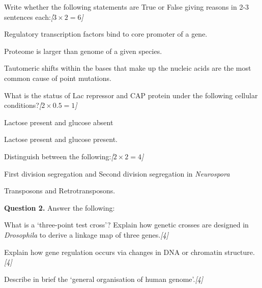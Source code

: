 \documentclass[11pt,a4paper]{article}
\newcommand{\pts}[1]{\hfill   \textit{[#1]}}
\begin{document}
\begin{parts}
  \item Write whether the following statements are True or False giving reasons in 2-3 sentences each:\pts{$3  \times 2 = 6$}
  
\begin{parts}
    \item Regulatory transcription factors bind to core promoter of a gene.
    \item Proteome is larger than genome of a given species.
    \item Tautomeric shifts within the bases that make up the nucleic acids are the most common cause of point mutations.
  \end{parts}
  
  \item What is the status of Lac repressor and CAP protein under the following cellular conditions?\pts{$2  \times 0.5 = 1$}
  
\begin{parts}
    \item Lactose present and glucose absent
    \item Lactose present and glucose present.
  \end{parts}

  \item Distinguish between the following:\pts{$2  \times 2 = 4$}
  
\begin{parts}
    \item First division segregation and Second division segregation in   \textit{Neurospora}
    \item Transposons and Retrotransposons.
  \end{parts}
\end{parts}

\medskip


\noindent   \textbf{Question 2.} Answer the following:

\begin{parts}
  \item What is a `three-point test cross'? Explain how genetic crosses are designed in   \textit{Drosophila} to derive a linkage map of three genes.\pts{4}
  \item Explain how gene regulation occurs via changes in DNA or chromatin structure.\pts{4}
  \item Describe in brief the `general organisation of human genome'.\pts{4}
\end{parts}
\end{document}
